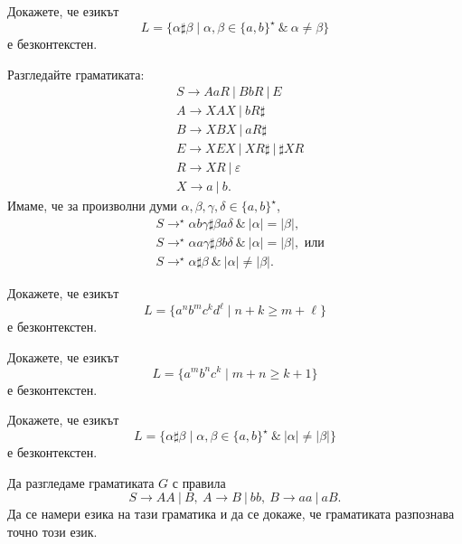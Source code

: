 \begin{extra}
\begin{problem}
 Докажете, че езикът
 \[L = \{\alpha \sharp \beta \mid \alpha,\beta \in \{a,b\}^\star\ \&\ \alpha \neq \beta \}\]
 е безконтекстен.
\end{problem}
\begin{hint}
  Разгледайте граматиката:
  \begin{align*}
    & S \to AaR\ |\ BbR\ |\ E\\
    & A \to XAX\ |\ bR\sharp\\
    & B \to XBX\ |\ aR\sharp\\
    & E \to XEX\ |\ XR\sharp\ |\ \sharp XR\\
    & R \to XR\ |\ \varepsilon\\
    & X \to a\ |\ b.
  \end{align*}
  Имаме, че за произволни думи $\alpha,\beta,\gamma,\delta \in \{a,b\}^\star$,
  \begin{align*}
    & S \to^\star \alpha b \gamma \sharp \beta a \delta\ \&\ |\alpha| = |\beta|,\\
    & S \to^\star \alpha a \gamma \sharp \beta b \delta\ \&\ |\alpha| = |\beta|, \text{ или}\\
    & S \to^\star \alpha \sharp \beta\ \&\ |\alpha| \neq |\beta|.
  \end{align*}      
\end{hint}

\begin{problem}
  Докажете, че езикът 
  \[L = \{a^nb^mc^kd^\ell \mid n+k \geq m + \ell\}\]
  е безконтекстен.
\end{problem}

\begin{problem}
  Докажете, че езикът 
  \[L = \{a^mb^nc^k\mid m+n \geq k + 1\}\]
  е безконтекстен.  
\end{problem}

\begin{problem}
  Докажете, че езикът
  \[L = \{\alpha \sharp \beta \mid \alpha,\beta \in \{a,b\}^\star\ \&\ |\alpha| \neq |\beta| \}\]
  е безконтекстен.
\end{problem}

\begin{problem}
  Да разгледаме граматиката $G$ с правила
  \[S \to AA\ |\ B,\ A \to B\ |\ bb,\ B \to aa\ |\ aB.\]
  Да се намери езика на тази граматика и да се докаже, че граматиката разпознава точно този език.
\end{problem}

\end{extra}


